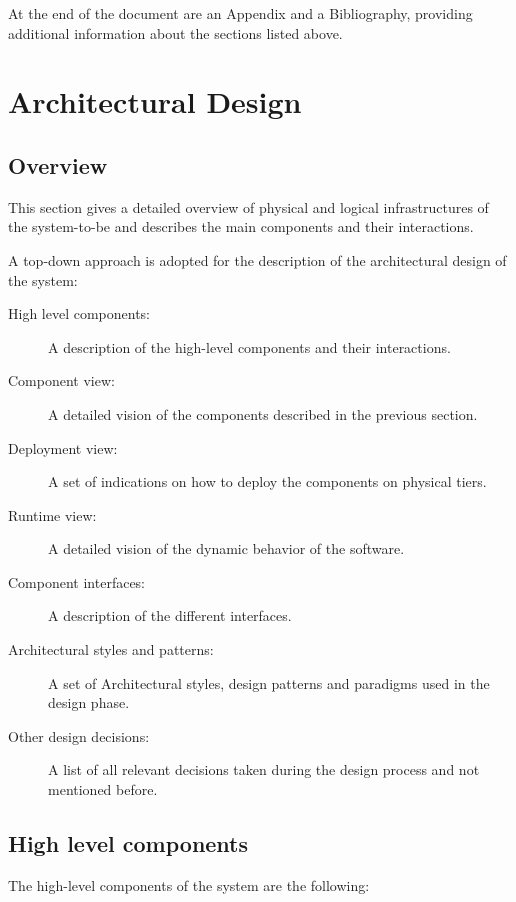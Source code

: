 \documentclass{article}
\begin{document}
	\bigskip
	At the end of the document are an Appendix and a Bibliography, providing additional information about the sections listed above.

	\section{Architectural Design}


	\subsection{Overview}

	This section gives a detailed overview of physical and logical infrastructures of the system-to-be and describes the main components and their interactions.

	A top-down approach is adopted for the description of the architectural design of the system:

	\bigskip
	\begin{description}
	\item [High level components:] A description of the high-level components and their interactions.
	\item [Component view:] A detailed vision of the components described in the previous section.
	\item [Deployment view:] A set of indications on how to deploy the components on physical tiers.
	\item [Runtime view:] A detailed vision of the dynamic behavior of the software.
	\item [Component interfaces:] A description of the different interfaces.
	\item [Architectural styles and patterns:] A set of Architectural styles, design patterns and paradigms used in the design phase.
	\item [Other design decisions:] A list of all relevant decisions taken during the design process and not mentioned before.
	\end{description}


	\subsection{High level components}

	The high-level components of the system are the following:
\end{document}
